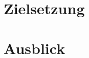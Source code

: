 \documentclass[a4paper, 12pt]{article} %
\begin{document}
\clearpage

\section{Zielsetzung}


\clearpage
\section{Ausblick}

\clearpage

\begingroup
\renewcommand{\bibfont}{\fontsize{13pt}{12pt}\selectfont}  
\sloppy
\nocite{*}
\printbibliography
\end{document}
